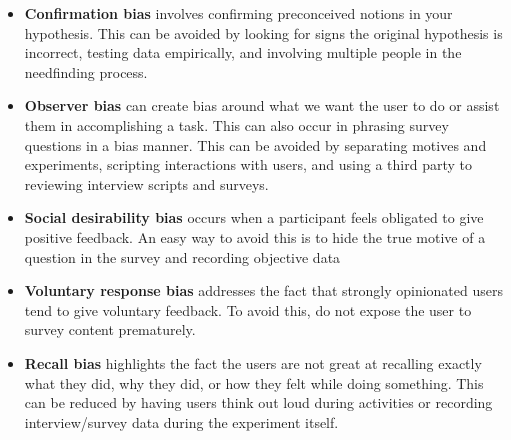 \begin{itemize}
\item
  \textbf{Confirmation bias} involves confirming preconceived notions in your hypothesis. This can be avoided by looking for signs the original hypothesis is incorrect, testing data empirically, and involving multiple people in the needfinding process.
\item
  \textbf{Observer bias} can create bias around what we want the user to do or assist them in accomplishing a task. This can also occur in phrasing survey questions in a bias manner. This can be avoided by separating motives and experiments, scripting interactions with users, and using a third party to reviewing interview scripts and surveys.
\item
  \textbf{Social desirability bias} occurs when a participant feels obligated to give positive feedback. An easy way to avoid this is to hide the true motive of a question in the survey and recording objective data
\item
  \textbf{Voluntary response bias} addresses the fact that strongly opinionated users tend to give voluntary feedback. To avoid this, do not expose the user to survey content prematurely.
\item
  \textbf{Recall bias} highlights the fact the users are not great at recalling exactly what they did, why they did, or how they felt while doing something. This can be reduced by having users think out loud during activities or recording interview/survey data during the experiment itself.
\end{itemize}




